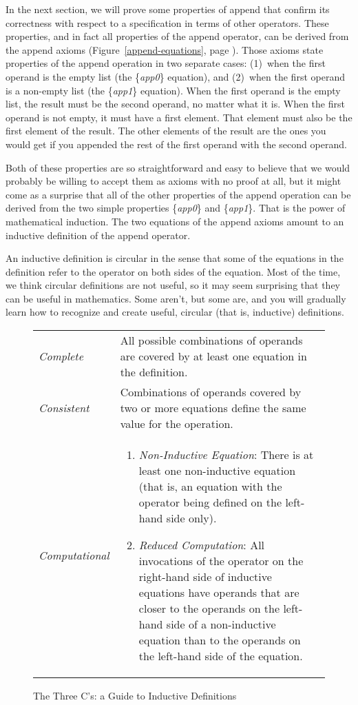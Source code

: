 In the next section, we will prove some properties of append
that confirm its correctness with respect to a specification in terms of other operators.
These properties, and in fact all properties of the append operator,
can be derived from the append axioms (Figure~\ref{append-equations}, page \pageref{append-equations}).
Those axioms state properties of the append operation in two separate cases:
(1)~when the first operand is the empty list (the \{\emph{app0}\} equation), and
(2)~when the first operand is a non-empty list (the \{\emph{app1}\} equation).
When the first operand is the empty list,
the result must be the second operand, no matter what it is.
When the first operand is not empty, it must have a first element.
That element must also be the first element of the result.
The other elements of the result are the ones you would get
if you appended the rest of the first operand with the second operand.

Both of these properties are so straightforward and easy to believe
that we would probably be willing to accept them as axioms with no proof at all,
but it might come as a surprise that all of the other properties
of the append operation can be derived from
the two simple properties \{\emph{app0}\} and \{\emph{app1}\}.
That is the power of mathematical induction.
The two equations of the append axioms
amount to an inductive definition of the append operator.

An inductive definition is circular in the sense
that some of the equations in the definition refer
to the operator on both sides of the equation.
Most of the time, we think circular definitions are not useful,
so it may seem surprising that they can be useful in mathematics.
Some aren't, but some are, and you will
gradually learn how to recognize and create useful,
circular (that is, inductive) definitions.

\begin{figure}
\begin{center}
\begin{tabular}{lp{3.5in}}
\emph{Complete} & All possible combinations of operands are covered by at least one equation in the definition. \\
\emph{Consistent} & Combinations of operands covered by two or more equations define the same value for the operation. \\
\emph{Computational} &
\begin{enumerate}
\item \emph{Non-Inductive Equation}: There is at least one non-inductive equation
(that is, an equation with the operator being defined
on the left-hand side only).
\item \emph{Reduced Computation}: All invocations of the operator on the right-hand side of inductive equations
have operands that are closer to the operands on the left-hand side of a non-inductive equation
than to the operands on the left-hand side of the equation.
\end{enumerate}
\end{tabular}
\end{center}
\caption{The Three C's: a Guide to Inductive Definitions}
\label{fig:inductive-def-keys}
\end{figure}

